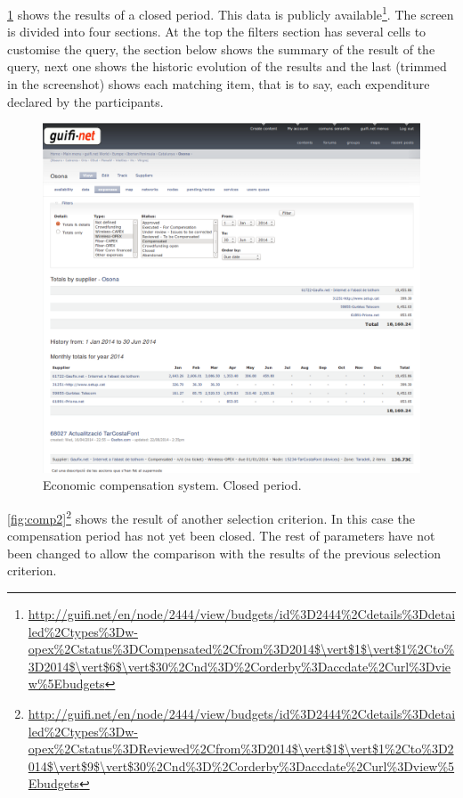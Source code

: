 \figurename \ref{fig:comp1} shows the results of a closed period. This data is publicly available\footnote{\url{http://guifi.net/en/node/2444/view/budgets/id\%3D2444\%2Cdetails\%3Ddetailed\%2Ctypes\%3Dw-opex\%2Cstatus\%3DCompensated\%2Cfrom\%3D2014$\vert$1$\vert$1\%2Cto\%3D2014$\vert$6$\vert$30\%2Cnd\%3D\%2Corderby\%3Daccdate\%2Curl\%3Dview\%5Ebudgets} }. The screen is divided into four sections. At the top the filters section has several cells to customise the query, the section below shows the summary of the result of the query, next one shows the historic evolution of the results and the last (trimmed in the screenshot) shows each matching item, that is to say, each expenditure declared by the participants.

\begin{figure}[H]
  \centering
  \includegraphics[width=0.95\linewidth]{sect2/figures/Compen_Osona_crop.png}
  \caption[Economic compensation system. Closed period.]{Economic compensation system. Closed period.}
  \label{fig:comp1}
\end{figure}

\figurename \ref{fig:comp2}\footnote{\url{http://guifi.net/en/node/2444/view/budgets/id\%3D2444\%2Cdetails\%3Ddetailed\%2Ctypes\%3Dw-opex\%2Cstatus\%3DReviewed\%2Cfrom\%3D2014$\vert$1$\vert$1\%2Cto\%3D2014$\vert$9$\vert$30\%2Cnd\%3D\%2Corderby\%3Daccdate\%2Curl\%3Dview\%5Ebudgets} } shows the result of another selection criterion. In this case the compensation period has not yet been closed. The rest of parameters have not been changed to allow the comparison with the results of the previous selection criterion.

